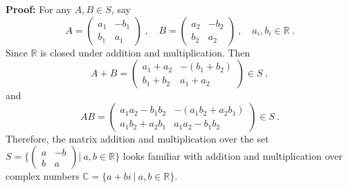 \documentclass[12pt]{article}
\begin{document}
\begin{enumerate}
\smallskip
{\bf Proof:} For any $A, B \in S$, say
$$
A = \begin{pmatrix}
a_1 & -b_1 \\
b_1 & a_1
\end{pmatrix}~, \quad
B = \begin{pmatrix}
a_2 & -b_2 \\
b_2 & a_2
\end{pmatrix}~,\quad
a_i, b_i \in \mathbb{R}~.
$$
Since $\mathbb{R}$ is closed under addition and multiplication. Then
$$
A + B = \begin{pmatrix}
a_1 + a_2 & - (b_1 + b_2) \\
b_1 + b_2 & a_1 + a_2
\end{pmatrix} \in S~,
$$
and
$$
A B = \begin{pmatrix}
    a_1 a_2 - b_1 b_2 & - (a_1 b_2 + a_2 b_1) \\
    a_1 b_2 + a_2 b_1 & a_1 a_2 - b_1 b_2
\end{pmatrix} \in S~.
$$
Therefore, the matrix addition and multiplication over the set $S =\Big\{ \begin{pmatrix}
    a & -b \\
    b & a
    \end{pmatrix} {\Big |} \  a,b \in \mathbb{R} \Big\}$ looks familiar with addition and multiplication over complex numbers $\mathbb{C} = \{ a + b i \ | \ a, b\in \mathbb{R} \}$.

\end{enumerate}
\end{document}
